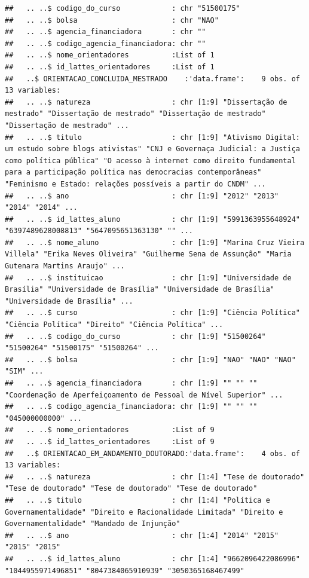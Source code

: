 \documentclass[]{article}
\begin{document}
\begin{verbatim}
##   .. ..$ codigo_do_curso            : chr "51500175"
##   .. ..$ bolsa                      : chr "NAO"
##   .. ..$ agencia_financiadora       : chr ""
##   .. ..$ codigo_agencia_financiadora: chr ""
##   .. ..$ nome_orientadores          :List of 1
##   .. ..$ id_lattes_orientadores     :List of 1
##   ..$ ORIENTACAO_CONCLUIDA_MESTRADO    :'data.frame':    9 obs. of  13 variables:
##   .. ..$ natureza                   : chr [1:9] "Dissertação de mestrado" "Dissertação de mestrado" "Dissertação de mestrado" "Dissertação de mestrado" ...
##   .. ..$ titulo                     : chr [1:9] "Ativismo Digital: um estudo sobre blogs ativistas" "CNJ e Governaça Judicial: a Justiça como política pública" "O acesso à internet como direito fundamental para a participação política nas democracias contemporâneas" "Feminismo e Estado: relações possíveis a partir do CNDM" ...
##   .. ..$ ano                        : chr [1:9] "2012" "2013" "2014" "2014" ...
##   .. ..$ id_lattes_aluno            : chr [1:9] "5991363955648924" "6397489628008813" "5647095651363130" "" ...
##   .. ..$ nome_aluno                 : chr [1:9] "Marina Cruz Vieira Villela" "Erika Neves Oliveira" "Guilherme Sena de Assunção" "Maria Gutenara Martins Araujo" ...
##   .. ..$ instituicao                : chr [1:9] "Universidade de Brasília" "Universidade de Brasília" "Universidade de Brasília" "Universidade de Brasília" ...
##   .. ..$ curso                      : chr [1:9] "Ciência Política" "Ciência Política" "Direito" "Ciência Política" ...
##   .. ..$ codigo_do_curso            : chr [1:9] "51500264" "51500264" "51500175" "51500264" ...
##   .. ..$ bolsa                      : chr [1:9] "NAO" "NAO" "NAO" "SIM" ...
##   .. ..$ agencia_financiadora       : chr [1:9] "" "" "" "Coordenação de Aperfeiçoamento de Pessoal de Nível Superior" ...
##   .. ..$ codigo_agencia_financiadora: chr [1:9] "" "" "" "045000000000" ...
##   .. ..$ nome_orientadores          :List of 9
##   .. ..$ id_lattes_orientadores     :List of 9
##   ..$ ORIENTACAO_EM_ANDAMENTO_DOUTORADO:'data.frame':    4 obs. of  13 variables:
##   .. ..$ natureza                   : chr [1:4] "Tese de doutorado" "Tese de doutorado" "Tese de doutorado" "Tese de doutorado"
##   .. ..$ titulo                     : chr [1:4] "Política e Governamentalidade" "Direito e Racionalidade Limitada" "Direito e Governamentalidade" "Mandado de Injunção"
##   .. ..$ ano                        : chr [1:4] "2014" "2015" "2015" "2015"
##   .. ..$ id_lattes_aluno            : chr [1:4] "9662096422086996" "1044955971496851" "8047384065910939" "3050365168467499"

\end{verbatim}
\end{document}
